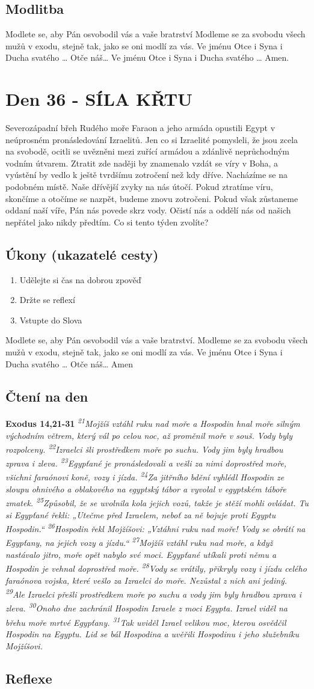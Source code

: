 \documentclass[11pt]{article}
\newcommand{\zacatekSestyTyden}{
  Severozápadní břeh Rudého moře \newline 
  Faraon a jeho armáda opustili Egypt v neúprosném pronásledování Izraelitů. Jen co si Izraelité pomysleli, že jsou zcela na svobodě, ocitli se uvězněni mezi zuřící armádou a zdánlivě neprůchodným vodním útvarem. Ztratit zde naději by znamenalo vzdát se víry v Boha, a vyústění by vedlo k ještě tvrdšímu zotročení než kdy dříve. Nacházíme se na podobném místě. Naše dřívější zvyky na nás útočí. Pokud ztratíme víru, skončíme a otočíme se nazpět, budeme znovu zotročeni. Pokud však zůstaneme oddaní naší víře, Pán nás povede skrz vody. Očistí nás a oddělí nás od našich nepřátel jako nikdy předtím. Co si tento týden zvolíte?

\subsection*{Úkony (ukazatelé cesty)}
\begin{enumerate}
  \item Udělejte si čas na dobrou zpověď
  \item Držte se reflexí
  \item Vstupte do Slova
\end{enumerate}
Modlete se, aby Pán osvobodil vás a vaše bratrství. \newline
Modleme se za svobodu všech mužů v exodu, stejně tak, jako se oni modlí za vás.\newline
Ve jménu Otce i Syna i Ducha svatého …  Otče náš… Amen
}
\begin{document}
\subsection*{Modlitba}
Modlete se, aby Pán osvobodil vás a vaše bratrství \newline
Modleme se za svobodu všech mužů v exodu, stejně tak, jako se oni modlí za vás.\newline
Ve jménu Otce i Syna i Ducha svatého … Otče náš… Ve jménu Otce i Syna i Ducha svatého … Amen.
\newpage
\newpage
\section{Den 36 - SÍLA KŘTU }
\zacatekSestyTyden
\subsection*{Čtení na den}
\textbf{Exodus 14,21-31}
\newline
\textit{
\textsuperscript{21}Mojžíš vztáhl ruku nad moře a Hospodin hnal moře silným východním větrem, který vál po celou noc, až proměnil moře v souš. Vody byly rozpolceny.
\textsuperscript{22}Izraelci šli prostředkem moře po suchu. Vody jim byly hradbou zprava i zleva.
\textsuperscript{23}Egypťané je pronásledovali a vešli za nimi doprostřed moře, všichni faraónovi koně, vozy i jízda.
\textsuperscript{24}Za jitřního bdění vyhlédl Hospodin ze sloupu ohnivého a oblakového na egyptský tábor a vyvolal v egyptském táboře zmatek.
\textsuperscript{25}Způsobil, že se uvolnila kola jejich vozů, takže je stěží mohli ovládat. Tu si Egypťané řekli: „Utečme před Izraelem, neboť za ně bojuje proti Egyptu Hospodin.“
\textsuperscript{26}Hospodin řekl Mojžíšovi: „Vztáhni ruku nad moře! Vody se obrátí na Egypťany, na jejich vozy a jízdu.“
\textsuperscript{27}Mojžíš vztáhl ruku nad moře, a když nastávalo jitro, moře opět nabylo své moci. Egypťané utíkali proti němu a Hospodin je vehnal doprostřed moře.
\textsuperscript{28}Vody se vrátily, přikryly vozy i jízdu celého faraónova vojska, které vešlo za Izraelci do moře. Nezůstal z nich ani jediný.
\textsuperscript{29}Ale Izraelci přešli prostředkem moře po suchu a vody jim byly hradbou zprava i zleva.
\textsuperscript{30}Onoho dne zachránil Hospodin Izraele z moci Egypta. Izrael viděl na břehu moře mrtvé Egypťany.
\textsuperscript{31}Tak uviděl Izrael velikou moc, kterou osvědčil Hospodin na Egyptu. Lid se bál Hospodina a uvěřili Hospodinu i jeho služebníku Mojžíšovi.
}

\subsection*{Reflexe}
\end{document}
